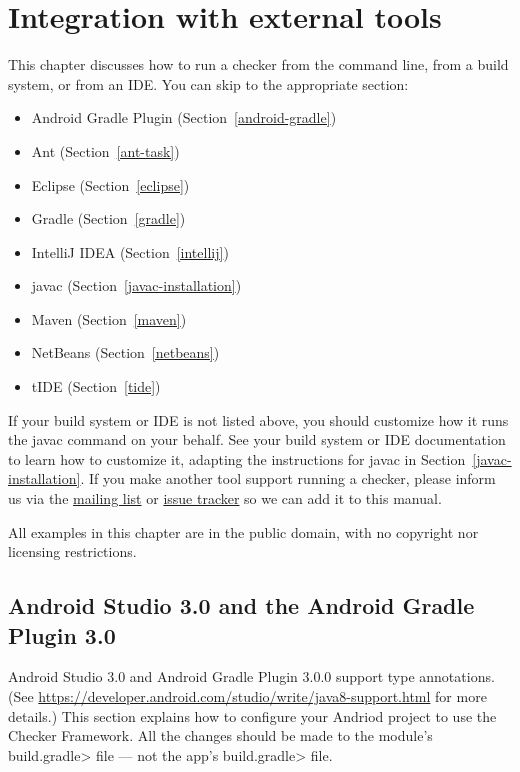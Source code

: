\htmlhr
\chapter{Integration with external tools\label{external-tools}}

This chapter discusses how to run a checker from the command line, from a
build system, or from an IDE\@.  You can skip to the appropriate section:

\begin{itemize}
\item Android Gradle Plugin (Section~\ref{android-gradle})
\item Ant (Section~\ref{ant-task})
\item Eclipse (Section~\ref{eclipse})
\item Gradle (Section~\ref{gradle})
\item IntelliJ IDEA (Section~\ref{intellij})
\item javac (Section~\ref{javac-installation})
\item Maven (Section~\ref{maven})
\item NetBeans (Section~\ref{netbeans})
\item tIDE (Section~\ref{tide})
\end{itemize}

If your build system or IDE is not listed above, you should customize how
it runs the javac command on your behalf.  See your build system or IDE
documentation to learn how to
customize it, adapting the instructions for javac in Section~\ref{javac-installation}.
If you make another tool support running a checker, please
inform us via the
\href{https://groups.google.com/forum/#!forum/checker-framework-discuss}{mailing
  list} or
\href{https://github.com/typetools/checker-framework/issues}{issue tracker} so
we can add it to this manual.

All examples in this chapter are in the public domain, with no copyright nor
licensing restrictions.


\section{Android Studio 3.0 and the Android Gradle Plugin 3.0\label{android-gradle}}

Android Studio 3.0 and Android Gradle Plugin 3.0.0 support type
annotations.  (See
\url{https://developer.android.com/studio/write/java8-support.html}
for more details.)  This section explains how to configure your Andriod
project to use the Checker Framework.  All the changes should be made to
the module's \<build.gradle> file --- not the app's \<build.gradle> file.

